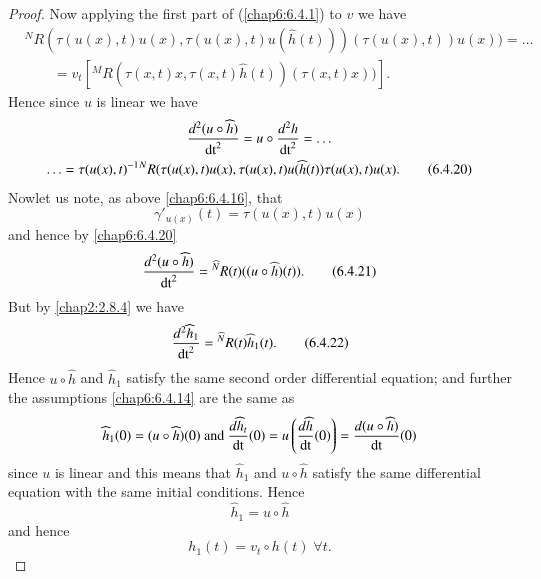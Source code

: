 \begin{proof}
Now applying the first part of (\ref{chap6:6.4.1}) to $v$ we have
\begin{equation*}
\begin{split}
&
  {}^{N}R(\tau(u(x),t)u(x),\tau(u(x),t)u(\widehat{h}(t)))(\tau(u(x),t))u(x))=\ldots\\
&\qquad
  =v_{t}\left[{}^{M}R(\tau(x,t)x,\tau(x,t)\widehat{h}(t))(\tau(x,t)x))\right]. 
\end{split}\tag{6.4.19}\label{chap6:6.4.19}
\end{equation*}
Hence since $u$ is linear we have
\begin{gather*}
\frac{d^{2}(u\circ \widehat{h})}{\operatorname{dt}^{2}}=u\circ
\frac{d^{2}h}{\operatorname{dt}^{2}}=\ldots\\
\ldots=\tau(u(x),t)^{-1}{}^{N}R(\tau(u(x),t)u(x),\tau(u(x),t)u(\widehat{h}(t))\tau(u(x),t)u(x).\tag{6.4.20}\label{chap6:6.4.20}
\end{gather*}
Now\pageoriginale let us note, as above \eqref{chap6:6.4.16}, that
$$
\gamma'_{u(x)}(t)=\tau(u(x),t)u(x)
$$
and hence by \eqref{chap6:6.4.20}
\begin{equation*}
\frac{d^{2}(u\circ
  \widehat{h})}{\operatorname{dt}^{2}}={}^{\widehat{N}}R(t)((u\circ\widehat{h})(t)).\tag{6.4.21}\label{chap6:6.4.21} 
\end{equation*}
But by \eqref{chap2:2.8.4} we have
\begin{equation*}
\frac{d^{2}\widehat{h}_{1}}{\operatorname{dt}^{2}}={}^{\widehat{N}}R(t)\widehat{h}_{1}(t).\tag{6.4.22}\label{chap6:6.4.22} 
\end{equation*}
Hence $u\circ\widehat{h}$ and $\widehat{h}_{1}$ satisfy the same
second order differential equation; and further the assumptions
\eqref{chap6:6.4.14} are the same as
$$
\widehat{h}_{1}(0)=(u\circ\widehat{h})(0)\text{ and }
\frac{d\widehat{h}_{t}}{\operatorname{dt}}(0)=u\left(\frac{d\widehat{h}}{\operatorname{dt}}(0)\right)=\frac{d(u\circ\widehat{h})}{\operatorname{dt}}(0) 
$$
since $u$ is linear and this means that $\widehat{h}_{1}$ and
$u\circ\widehat{h}$ satisfy the same differential equation with the
same initial conditions. Hence
\begin{equation*}
\widehat{h}_{1}=u\circ \widehat{h}\tag{6.4.23}\label{chap6:6.4.23}
\end{equation*}
and hence
\begin{equation*}
h_{1}(t)=v_{t}\circ h(t) \;\forall t.\tag{6.4.24}\label{chap6:6.4.24}
\end{equation*}
\end{proof}

